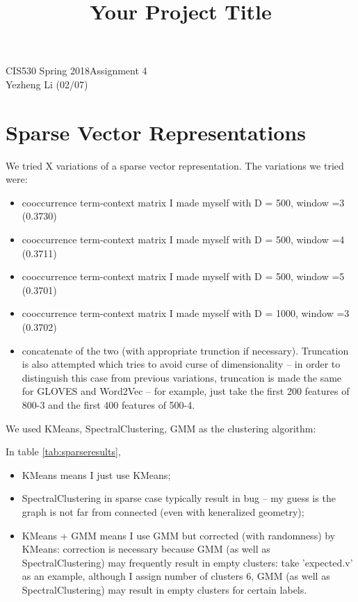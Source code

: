 \documentclass[12pt]{article}
\title{Your Project Title}
\begin{document}
CIS530 Spring 2018\hfill Assignment 4\\
Yezheng Li (02/07)

\hrulefill

\section{Sparse Vector Representations}

We tried X variations of a sparse vector representation. The variations we tried were:

\begin{itemize}
\item cooccurrence term-context matrix I made myself with D = 500, window =3 (0.3730)
\item cooccurrence term-context matrix I made myself with D = 500, window =4 (0.3711)
\item cooccurrence term-context matrix I made myself with D = 500, window =5 (0.3701)
\item cooccurrence term-context matrix I made myself with D = 1000, window =3 (0.3702)
\item concatenate of the two (with appropriate trunction if necessary). Truncation is also attempted which tries to avoid curse of dimensionality -- in order to distinguish this case from previous variations, truncation is made the same for GLOVES and Word2Vec -- for example, just take the first 200 features of 800-3 and the first 400 features of 500-4.
\end{itemize}

We used KMeans, SpectralClustering, GMM as the clustering algorithm:

In table \ref{tab:sparseresults},
\begin{itemize}
	\item  KMeans means I just use KMeans;
	\item SpectralClustering in sparse case typically result in bug -- my guess is the graph is not far from connected (even with keneralized geometry);
	\item KMeans + GMM means I use GMM but corrected (with randomness) by KMeans: correction is necessary because GMM (as well as SpectralClustering) may frequently result in empty clusters: take 'expected.v' as an example, although I assign number of clusters 6, GMM (as well as SpectralClustering) may result in empty clusters for certain labels.
\end{itemize}
\end{document}

